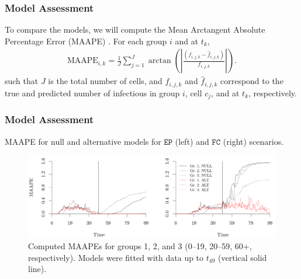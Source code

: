 \documentclass[12pt, aspectratio = 169]{beamer} %
\begin{document}
	\begin{frame}[t]
		\frametitle{Model Assessment}
		\justifying
		
		To compare the models, we will compute the Mean Arctangent Absolute Percentage Error (MAAPE) \citep{kim2016new}. For each group $i$ and at $t_k$, 
		\begin{align*}
			\text{MAAPE}_{i, k} = \frac{1}{J} \sum_{j = 1}^{J} \arctan\left(\left|\frac{(f_{i, j, k} - \hat{f}_{i, j, k})}{f_{i, j, k}}\right|\right).
		\end{align*}
		such that $J$ is the total number of cells, and $f_{i, j, k}$ and $\hat{f}_{i, j, k}$ correspond to the true and predicted number of infectious in group $i$, cell $c_j$, and at $t_k$, respectively.
		
	\end{frame}
	
	\begin{frame}[t]
		\frametitle{Model Assessment}
		\justifying
		
		MAAPE for null and alternative models for $\texttt{EP}$ (left) and $\texttt{FC}$ (right) scenarios.\vspace{-3pt}
		\begin{figure}[!ht]
			\centering
			\includegraphics[width = 1\textwidth]{Images/computed_errors.png}\vspace{-6pt}
			\caption{\justifying Computed MAAPEs for groups 1, 2, and 3 (0--19, 20--59, 60+,  respectively). Models were fitted with data up to $t_{49}$ (vertical solid line).}
			\label{fig:computederrors}
		\end{figure}
		
	\end{frame}
	
\end{document}
